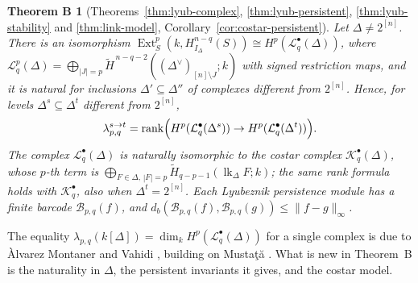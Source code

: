 \documentclass[11pt]{article}
\theoremstyle{plain}
\newtheorem*{theoremB}{Theorem B}
\theoremstyle{definition}
\newcommand{\kk}{k}
\newcommand{\link}{\operatorname{lk}}
\newcommand{\Ext}{\operatorname{Ext}}
\newcommand{\rank}{\operatorname{rank}}
\newcommand{\rH}{\widetilde{H}}
\newcommand{\Hloc}[2]{H^{#1}_{#2}}
\newcommand{\Lc}{\mathcal L}
\newcommand{\Kc}{\mathcal K}
\begin{document}
\begin{theoremB}[Theorems~\ref{thm:lyub-complex}, \ref{thm:lyub-persistent},
\ref{thm:lyub-stability} and \ref{thm:link-model}, Corollary~\ref{cor:costar-persistent}]
Let $\Delta\neq2^{[n]}$. There is an isomorphism
$\Ext^p_S(\kk,\Hloc{n-q}{I_\Delta}(S))\cong H^p(\Lc^\bullet_q(\Delta))$, where
$\Lc^p_q(\Delta)=\bigoplus_{|J|=p}\rH^{\,n-q-2}((\Delta^\vee)_{[n]\setminus J};\kk)$ with
signed restriction maps, and it is natural for inclusions $\Delta'\subseteq\Delta''$ of
complexes different from $2^{[n]}$. Hence, for levels $\Delta^s\subseteq\Delta^t$
different from $2^{[n]}$,
\[
\lambda^{s\to t}_{p,q}=\rank\Bigl(H^p(\Lc^\bullet_q(\Delta^s))\to H^p(\Lc^\bullet_q(\Delta^t))\Bigr).
\]
The complex $\Lc^\bullet_q(\Delta)$ is naturally isomorphic to the costar complex
$\Kc^\bullet_q(\Delta)$, whose $p$-th term is
$\bigoplus_{F\in\Delta,\,|F|=p}\rH_{q-p-1}(\link_\Delta F;\kk)$; the same rank formula holds
with $\Kc^\bullet_q$, also when $\Delta^t=2^{[n]}$. Each Lyubeznik persistence module has a
finite barcode $\mathcal B_{p,q}(f)$, and
$d_b(\mathcal B_{p,q}(f),\mathcal B_{p,q}(g))\le\|f-g\|_\infty$.
\end{theoremB}

The equality $\lambda_{p,q}(\kk[\Delta])=\dim_\kk H^p(\Lc^\bullet_q(\Delta))$ for a single
complex is due to \`Alvarez Montaner and Vahidi \cite{AlvarezMontanerVahidi}, building on
Musta\c{t}\u{a} \cite{Mustata}. What is new in Theorem~B is the naturality in $\Delta$,
the persistent invariants it gives, and the costar model.
\end{document}
